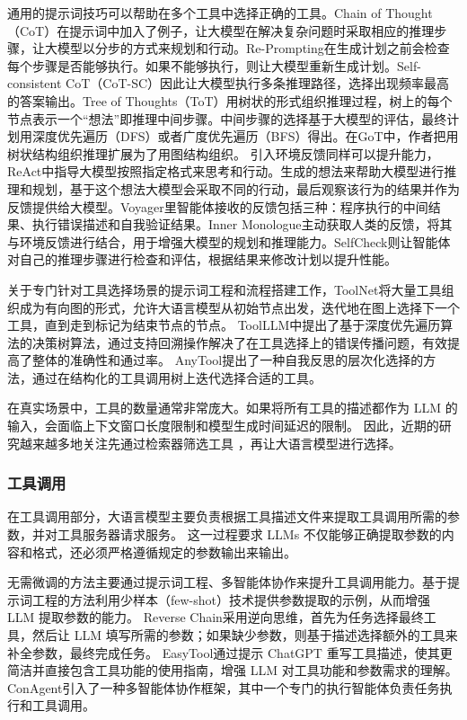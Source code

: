 通用的提示词技巧可以帮助在多个工具中选择正确的工具。Chain of Thought（CoT）\cite{Wang2023a}在提示词中加入了例子，让大模型在解决复杂问题时采取相应的推理步骤，让大模型以分步的方式来规划和行动。Re-Prompting\cite{Raman2022}在生成计划之前会检查每个步骤是否能够执行。如果不能够执行，则让大模型重新生成计划。Self-consistent CoT（CoT-SC）\cite{wang2022self}因此让大模型执行多条推理路径，选择出现频率最高的答案输出。Tree of Thoughts（ToT）\cite{Yao2023a}用树状的形式组织推理过程，树上的每个节点表示一个“想法”即推理中间步骤。中间步骤的选择基于大模型的评估，最终计划用深度优先遍历（DFS）或者广度优先遍历（BFS）得出。在GoT\cite{Besta2023}中，作者把用树状结构组织推理扩展为了用图结构组织。
引入环境反馈同样可以提升能力，ReAct\cite{Yao2023b}中指导大模型按照指定格式来思考和行动。生成的想法来帮助大模型进行推理和规划，基于这个想法大模型会采取不同的行动，最后观察该行为的结果并作为反馈提供给大模型。Voyager\cite{Wang2023b}里智能体接收的反馈包括三种：程序执行的中间结果、执行错误描述和自我验证结果。Inner Monologue\cite{Huang2022}主动获取人类的反馈，将其与环境反馈进行结合，用于增强大模型的规划和推理能力。SelfCheck\cite{Miao2023}则让智能体对自己的推理步骤进行检查和评估，根据结果来修改计划以提升性能。

关于专门针对工具选择场景的提示词工程和流程搭建工作，ToolNet\cite{Liu2024}将大量工具组织成为有向图的形式，允许大语言模型从初始节点出发，迭代地在图上选择下一个工具，直到走到标记为结束节点的节点。
ToolLLM\cite{Qin2023}中提出了基于深度优先遍历算法的决策树算法，通过支持回溯操作解决了在工具选择上的错误传播问题，有效提高了整体的准确性和通过率。
AnyTool\cite{Du2024}提出了一种自我反思的层次化选择的方法，通过在结构化的工具调用树上迭代选择合适的工具。

在真实场景中，工具的数量通常非常庞大。如果将所有工具的描述都作为 LLM 的输入，会面临上下文窗口长度限制和模型生成时间延迟的限制。
因此，近期的研究越来越多地关注先通过检索器筛选工具\cite{Qin2023, anantha2023protip, Liu2024} ，再让大语言模型进行选择。

\subsubsection{工具调用}

在工具调用部分，大语言模型主要负责根据工具描述文件来提取工具调用所需的参数，并对工具服务器请求服务。
这一过程要求 LLMs 不仅能够正确提取参数的内容和格式，还必须严格遵循规定的参数输出来输出。

无需微调的方法主要通过提示词工程、多智能体协作来提升工具调用能力。基于提示词工程的方法利用少样本（few-shot）技术提供参数提取的示例，从而增强 LLM 提取参数的能力\cite{Song2023, Liu2023a, Liu2024, hsieh2023tool}。
Reverse Chain\cite{zhang2023reverse}采用逆向思维，首先为任务选择最终工具，然后让 LLM 填写所需的参数；如果缺少参数，则基于描述选择额外的工具来补全参数，最终完成任务。
EasyTool\cite{yuan2024easytool}通过提示 ChatGPT 重写工具描述，使其更简洁并直接包含工具功能的使用指南，增强 LLM 对工具功能和参数需求的理解。
ConAgent\cite{shi2024learning}引入了一种多智能体协作框架，其中一个专门的执行智能体负责任务执行和工具调用。

